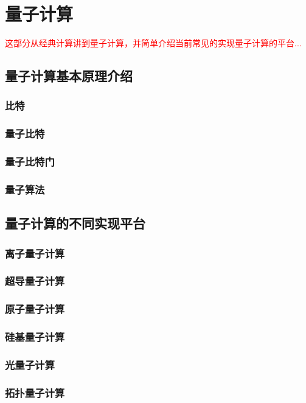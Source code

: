 
\chapter[量子计算]{量子计算}
\textcolor{red}{\small
这部分从经典计算讲到量子计算，并简单介绍当前常见的实现量子计算的平台... 
}
\section[量子计算基本原理介绍]{量子计算基本原理介绍}

\subsection[比特]{比特}

\subsection[量子比特]{量子比特}

\subsection[量子比特门]{量子比特门}

\subsection[量子算法]{量子算法}









\section[量子计算的不同实现平台]{量子计算的不同实现平台}

\subsection[离子量子计算]{离子量子计算}

\subsection[超导量子计算]{超导量子计算}

\subsection[原子量子计算]{原子量子计算}

\subsection[硅基量子计算]{硅基量子计算}

\subsection[光量子计算]{光量子计算}

\subsection[拓扑量子计算]{拓扑量子计算}






